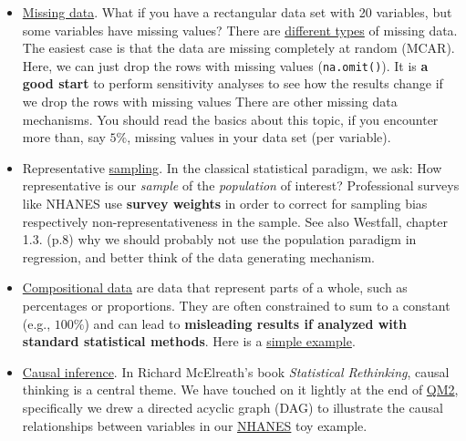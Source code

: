 \documentclass[
]{book}
\newcounter{none} %
\begin{document}
\begin{itemize}
\item
  \href{https://en.wikipedia.org/wiki/Missing_data}{Missing data}.
  What if you have a rectangular data set with 20 variables,
  but some variables have missing values?
  There are \href{https://en.wikipedia.org/wiki/Missing_data\#Types}{different types}
  of missing data. The easiest case is that the data are missing completely at random (MCAR).
  Here, we can just drop the rows with missing values (\texttt{na.omit()}).
  It is \textbf{a good start} to perform sensitivity analyses to see how the results change
  if we drop the rows with missing values
  There are other missing data mechanisms. You should read the basics about this topic,
  if you encounter more than, say \(5\%\), missing values in your data set (per variable).
\item
  Representative \href{https://en.wikipedia.org/wiki/Sampling_(statistics)}{sampling}.
  In the classical statistical paradigm, we ask: How representative is our \emph{sample} of the \emph{population} of interest?
  Professional surveys like NHANES use \textbf{survey weights} in order to correct for
  sampling bias respectively non-representativeness in the sample.
  See also Westfall, chapter 1.3. (p.8) why we should probably not use the population paradigm in regression,
  and better think of the data generating mechanism.
\item
  \href{https://en.wikipedia.org/wiki/Compositional_data}{Compositional data}
  are data that represent parts of a whole, such as percentages or proportions.
  They are often constrained to sum to a constant (e.g., \(100\%\)) and can
  lead to \textbf{misleading results if analyzed with standard statistical methods}.
  Here is a \href{https://www.geo.fu-berlin.de/en/v/soga-r/Advanced-statistics/Feature-scales/Intro_compositional_data/index.html}{simple example}.
\item
  \href{https://projecteuclid.org/journals/statistics-surveys/volume-3/issue-none/Causal-inference-in-statistics-An-overview/10.1214/09-SS057.full}{Causal inference}.
  In Richard McElreath's book \emph{Statistical Rethinking}, causal thinking is a central theme.
  We have touched on it lightly at the end of \href{https://jdegenfellner.github.io/Script_QM2_ZHAW/multiple-linear-regression.html\#more-than-2-predictors}{QM2},
  specifically we drew a directed acyclic graph (DAG) to illustrate the causal relationships
  between variables in our \href{https://jdegenfellner.github.io/Script_QM2_ZHAW/multiple-linear-regression.html\#example_nhanes}{NHANES} toy example.
\end{itemize}
\end{document}
